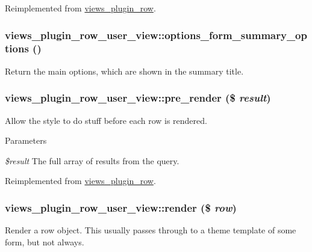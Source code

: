 Reimplemented from \hyperlink{classviews__plugin__row_a6914c39d64977a0aa71da39cc1af004e}{views\_\-plugin\_\-row}.\hypertarget{classviews__plugin__row__user__view_a13a199cb3edfcbbcf93be5d2169e11c1}{
\subsubsection[{options\_\-form\_\-summary\_\-options}]{\setlength{\rightskip}{0pt plus 5cm}views\_\-plugin\_\-row\_\-user\_\-view::options\_\-form\_\-summary\_\-options ()}}
\label{classviews__plugin__row__user__view_a13a199cb3edfcbbcf93be5d2169e11c1}
Return the main options, which are shown in the summary title. \hypertarget{classviews__plugin__row__user__view_a42d62630e62ef31aef94a88fccf173cb}{
\subsubsection[{pre\_\-render}]{\setlength{\rightskip}{0pt plus 5cm}views\_\-plugin\_\-row\_\-user\_\-view::pre\_\-render (\$ {\em result})}}
\label{classviews__plugin__row__user__view_a42d62630e62ef31aef94a88fccf173cb}
Allow the style to do stuff before each row is rendered.


\begin{DoxyParams}{Parameters}
\item[{\em \$result}]The full array of results from the query. \end{DoxyParams}


Reimplemented from \hyperlink{classviews__plugin__row_ae49a23f750874e4b3d294aa3a20ecd64}{views\_\-plugin\_\-row}.\hypertarget{classviews__plugin__row__user__view_a7d3b462a1d5f7cac2630fb42c8185407}{
\subsubsection[{render}]{\setlength{\rightskip}{0pt plus 5cm}views\_\-plugin\_\-row\_\-user\_\-view::render (\$ {\em row})}}
\label{classviews__plugin__row__user__view_a7d3b462a1d5f7cac2630fb42c8185407}
Render a row object. This usually passes through to a theme template of some form, but not always.


